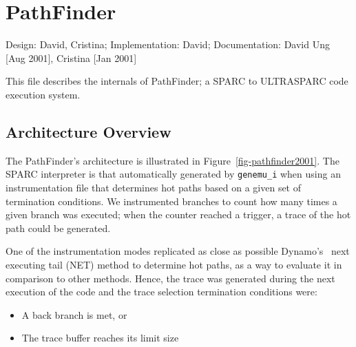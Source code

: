\chapter{PathFinder}
\label{ch-pathfinder}

{\small
\begin{flushright}
Design: David, Cristina; Implementation: David; 
Documentation: David Ung [Aug 2001], Cristina [Jan 2001]
\end{flushright}
}

This file describes the internals of PathFinder; a SPARC to ULTRASPARC code 
execution system.


\section{Architecture Overview}


The PathFinder's architecture is illustrated in Figure~\ref{fig-pathfinder2001}.
The SPARC interpreter is that automatically generated by \texttt{genemu\_i}
when using an instrumentation file that determines hot paths based on a 
given set of termination conditions.
We instrumented branches to count how many times a given branch was 
executed; when the counter reached a trigger, a trace of the hot 
path could be generated.

One of the instrumentation modes replicated as close as possible 
Dynamo's~\cite{Bala00} next executing tail (NET) method to determine
hot paths, as a way to evaluate it in comparison to other methods. 
Hence, the trace was generated during the next execution of the code 
and the trace selection termination conditions were:  

\begin{itemize}
\item A back branch is met, or 
\item The trace buffer reaches its limit size
\end{itemize}

